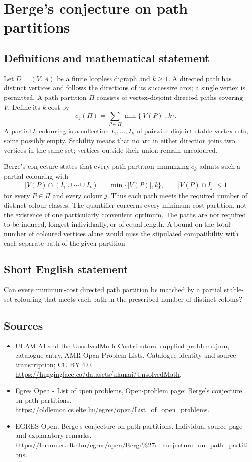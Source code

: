 \documentclass[11pt,a4paper]{article}
\begin{document}
\section*{Berge's conjecture on path partitions}\label{statement}

\subsection{Definitions and mathematical statement}
Let $D=(V,A)$ be a finite loopless digraph and $k\ge1$. A directed path
has distinct vertices and follows the directions of its successive arcs;
a single vertex is permitted. A path partition $\Pi$ consists of
vertex-disjoint directed paths covering $V$. Define its $k$-cost by
\[
                         c_k(\Pi)=\sum_{P\in\Pi}\min\{|V(P)|,k\}.
\]
A partial $k$-colouring is a collection $I_1,\ldots,I_k$ of pairwise
disjoint stable vertex sets, some possibly empty. Stability means that
no arc in either direction joins two vertices in the same set; vertices
outside their union remain uncoloured.

Berge's conjecture states that every path partition minimizing $c_k$
admits such a partial colouring with
\[
 |V(P)\cap(I_1\cup\cdots\cup I_k)|=\min\{|V(P)|,k\},
 \qquad |V(P)\cap I_j|\le1
\]
for every $P\in\Pi$ and every colour $j$.
Thus each path meets the required number of distinct colour classes.
The quantifier concerns every minimum-cost partition, not the existence
of one particularly convenient optimum. The paths are not required to
be induced, longest individually, or of equal length. A bound on the
total number of coloured vertices alone would miss the stipulated
compatibility with each separate path of the given partition.
\subsection{Short English statement}
Can every minimum-cost directed path partition be matched by a
partial stable-set colouring that meets each path in the prescribed number of distinct colours?
\subsection{Sources}
\begin{itemize}
\item[S1] ULAM.AI and the UnsolvedMath Contributors, supplied problems.json, catalogue entry, AMR Open Problem Lists. Catalogue identity and source transcription; CC BY 4.0.
\url{https://huggingface.co/datasets/ulamai/UnsolvedMath}.
\item[S2] Egres Open - List of open problems, Open-problem page: Berge's conjecture on path partitions. 
\url{https://oldlemon.cs.elte.hu/egres/open/List_of_open_problems}.
\item[S3] EGRES Open, Berge's conjecture on path partitions. Individual source page and explanatory remarks.
\url{https://lemon.cs.elte.hu/egres/open/Berge%27s_conjecture_on_path_partitions}.
\end{itemize}
\end{document}
